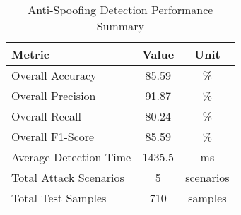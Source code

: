 \begin{table}[htbp]
\centering
\caption{Anti-Spoofing Detection Performance Summary}
\label{tab:antispoofing_summary}
\begin{tabular}{|l|c|c|}
\hline
\textbf{Metric} & \textbf{Value} & \textbf{Unit} \\
\hline
Overall Accuracy & 85.59 & \% \\
Overall Precision & 91.87 & \% \\
Overall Recall & 80.24 & \% \\
Overall F1-Score & 85.59 & \% \\
\hline
Average Detection Time & 1435.5 & ms \\
Total Attack Scenarios & 5 & scenarios \\
Total Test Samples & 710 & samples \\
\hline
\end{tabular}
\end{table}